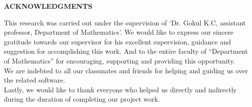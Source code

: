



\begin{center}
	{\Large{\bf{ACKNOWLEDGMENTS}}}\\
\end{center}

\noindent


\noindent
This research was carried out under the supervision of `Dr. Gokul K.C, assistant professor, Department of Mathematics'. We would like to express our sincere gratitude towards our supervisor for his excellent supervision, guidance and suggestion for accomplishing this work. And to the entire faculty of ``Department of Mathematics'' for encouraging, supporting and providing this opportunity.\\

\noindent
We are indebted to all our classmates and friends for helping and guiding us over the related software. \\

\noindent
Lastly, we would like to thank everyone who helped us directly and indirectly during the duration of completing our project work.



